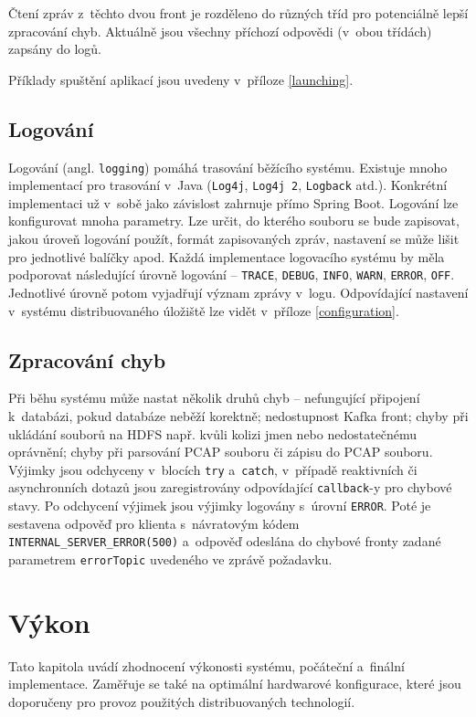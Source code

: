 \noindent Čtení zpráv z~těchto dvou front je rozděleno do různých tříd pro potenciálně lepší zpracování chyb. Aktuálně jsou všechny příchozí odpovědi (v~obou třídách) zapsány do logů.

Příklady spuštění aplikací jsou uvedeny v~příloze \ref{launching}.

\section{Logování}
Logování (angl. \texttt{logging}) pomáhá trasování běžícího systému. Existuje mnoho implementací pro trasování v~Java (\texttt{Log4j}, \texttt{Log4j 2}, \texttt{Logback} atd.). Konkrétní implementaci už v~sobě jako závislost zahrnuje přímo Spring Boot. Logování lze konfigurovat mnoha parametry. Lze určit, do kterého souboru se bude zapisovat, jakou úroveň logování použít, formát zapisovaných zpráv, nastavení se může lišit pro jednotlivé balíčky apod. Každá implementace logovacího systému by měla podporovat následující úrovně logování -- \texttt{TRACE}, \texttt{DEBUG}, \texttt{INFO}, \texttt{WARN}, \texttt{ERROR}, \texttt{OFF}. Jednotlivé úrovně potom vyjadřují význam zprávy v~logu. Odpovídající nastavení v~systému distribuovaného úložiště lze vidět v~příloze \ref{configuration}.

\section{Zpracování chyb}
Při běhu systému může nastat několik druhů chyb -- nefungující připojení k~databázi, pokud databáze neběží korektně; nedostupnost Kafka front; chyby při ukládání souborů na HDFS např. kvůli kolizi jmen nebo nedostatečnému oprávnění; chyby při parsování PCAP souboru či zápisu do PCAP souboru. Výjimky jsou odchyceny v~blocích \texttt{try} a~\texttt{catch}, v~případě reaktivních či asynchronních dotazů jsou zaregistrovány odpovídající \texttt{callback}-y pro chybové stavy. Po odchycení výjimek jsou výjimky logovány s~úrovní \texttt{ERROR}. Poté je sestavena odpověď pro klienta s~návratovým kódem \texttt{INTERNAL\_SERVER\_ERROR(500)} a~odpověď odeslána do chybové fronty zadané parametrem \texttt{errorTopic} uvedeného ve zprávě požadavku.

\chapter{Výkon} \label{chapter_performance}
Tato kapitola uvádí zhodnocení výkonosti systému, počáteční a~finální implementace. Zaměřuje se také na optimální hardwarové konfigurace, které jsou doporučeny pro provoz použitých distribuovaných technologií.

